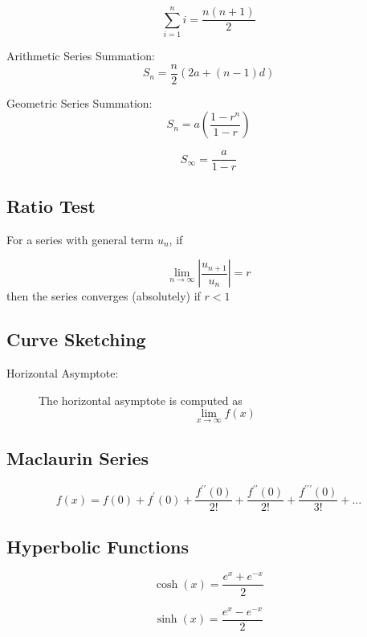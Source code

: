 \documentclass[a4paper,12pt]{article}
\begin{document}
	\[ \sum_{i=1}^{n} i = \frac{n(n+1)}{2}\]
	
	Arithmetic Series Summation:
	\[ S_n = \frac{n}{2} \left(2a + (n-1) d \right)\]
	
	Geometric Series Summation:
	\[ S_n = a\left(\frac{1-r^n}{1-r}\right)\]
	
	\[ S_\infty = \frac{a}{1-r}\]

	\subsection*{Ratio Test}
	
	For a series with general term $u_n$, if
	
	\[ \lim_{n \to \infty } \left| \frac{u_{n+1}}{u_n} \right| = r\]
	then the series converges (absolutely) if $r<1$


	
	
\subsection*{Curve Sketching}
\begin{description}
	\item[Horizontal Asymptote:] The horizontal asymptote is computed as
		\[ \lim_{x \to \infty } f(x) \]
\end{description}
	
			\subsection*{Maclaurin Series}
			\[f(x) = f(0) + f^{\prime}(0) + \frac{f^{\prime \prime}(0)}{2!} + \frac{f^{\prime \prime}(0)}{2!} + \frac{f^{\prime\prime \prime}(0)}{3!} + \ldots \]
	
	\subsection*{Hyperbolic Functions }
	
	\[ \cosh(x)  =  \frac{e^{x} + e^{-x}}{2} \]
	
	\[ \sinh(x)  = \frac{e^{x} - e^{-x}}{2} \]
	
	
\end{document}
